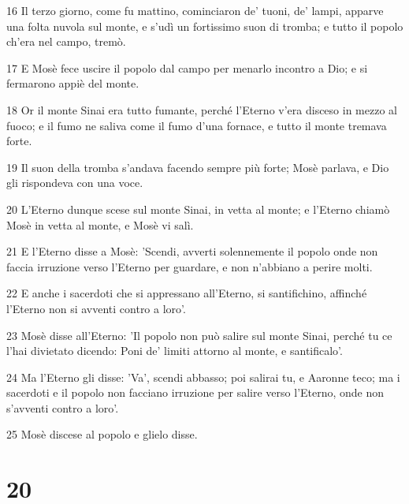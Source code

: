 \par 16 Il terzo giorno, come fu mattino, cominciaron de' tuoni, de' lampi, apparve una folta nuvola sul monte, e s'udì un fortissimo suon di tromba; e tutto il popolo ch'era nel campo, tremò.
\par 17 E Mosè fece uscire il popolo dal campo per menarlo incontro a Dio; e si fermarono appiè del monte.
\par 18 Or il monte Sinai era tutto fumante, perché l'Eterno v'era disceso in mezzo al fuoco; e il fumo ne saliva come il fumo d'una fornace, e tutto il monte tremava forte.
\par 19 Il suon della tromba s'andava facendo sempre più forte; Mosè parlava, e Dio gli rispondeva con una voce.
\par 20 L'Eterno dunque scese sul monte Sinai, in vetta al monte; e l'Eterno chiamò Mosè in vetta al monte, e Mosè vi salì.
\par 21 E l'Eterno disse a Mosè: 'Scendi, avverti solennemente il popolo onde non faccia irruzione verso l'Eterno per guardare, e non n'abbiano a perire molti.
\par 22 E anche i sacerdoti che si appressano all'Eterno, si santifichino, affinché l'Eterno non si avventi contro a loro'.
\par 23 Mosè disse all'Eterno: 'Il popolo non può salire sul monte Sinai, perché tu ce l'hai divietato dicendo: Poni de' limiti attorno al monte, e santificalo'.
\par 24 Ma l'Eterno gli disse: 'Va', scendi abbasso; poi salirai tu, e Aaronne teco; ma i sacerdoti e il popolo non facciano irruzione per salire verso l'Eterno, onde non s'avventi contro a loro'.
\par 25 Mosè discese al popolo e glielo disse.

\chapter{20}

